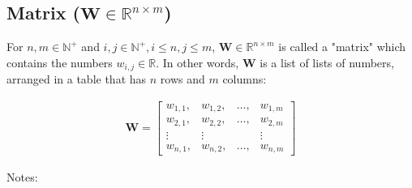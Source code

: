 \documentclass{article}
\begin{document}
      \subsection{Matrix ($\mathbf{W} \in \mathbb{R}^{n \times m}$)}

        For $n, m \in \mathbb{N}^+$ and
        $i, j \in \mathbb{N}^+, i \leq n, j \leq m$,
        $\mathbf{W} \in \mathbb{R}^{n \times m}$ is called a "matrix" which
        contains the numbers $w_{i, j} \in \mathbb{R}$. In other words,
        $\mathbf{W}$ is a list of lists of numbers, arranged in a table that has
        $n$ rows and $m$ columns:

        \begin{align*}
          \mathbf{W}
            = \begin{bmatrix}
                w_{1,1}, & w_{1,2}, & \ldots, & w_{1,m} \\
                w_{2,1}, & w_{2,2}, & \ldots, & w_{2,m} \\
                \vdots & \vdots & & \vdots \\
                w_{n,1}, & w_{n,2}, & \ldots, & w_{n,m}
              \end{bmatrix}
        \end{align*}

        Notes:
\end{document}
